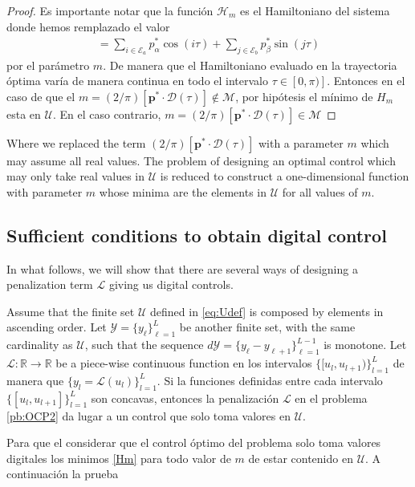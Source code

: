 \begin{proof}
Es importante notar que la función $\mathcal{H}_m$ es el Hamiltoniano del sistema donde hemos remplazado el valor 
\begin{gather}
	[\bm{p}^* \cdot \bm{\mathcal{D}}(\tau)] = \sum_{i \in \mathcal{E}_a} p^*_\alpha \cos(i\tau) + \sum_{j \in \mathcal{E}_b} p^*_\beta \sin(j\tau) 
\end{gather}
por el parámetro $m$. De manera que el Hamiltoniano evaluado en la trayectoria óptima varía de manera continua en todo el intervalo $\tau \in [0,\pi)]$. Entonces en el caso de que el $m = (2/\pi)[\bm{p}^* \cdot \bm{\mathcal{D}}(\tau)] \notin \mathcal{M}$, por hipótesis el mínimo de $H_m$ esta en $\mathcal{U}$. En el caso contrario, $m = (2/\pi)[\bm{p}^* \cdot \bm{\mathcal{D}}(\tau)] \in \mathcal{M}$  

\end{proof}
Where we replaced the term $(2/\pi)[\bm{p}^* \cdot \bm{\mathcal{D}}(\tau)]$ with a parameter $m$ which may assume all real values. The problem of designing an optimal control which may only take real values in $\mathcal{U}$ is reduced to construct a one-dimensional function with parameter $m$ whose minima are the elements in $\mathcal{U}$ for all values of $m$.

\subsection{Sufficient conditions to obtain digital control}

In what follows, we will show that there are several ways of designing a penalization term $\mathcal L$ giving us digital controls.
\newline
\begin{theorem}
Assume that the finite set $\mathcal{U}$ defined in \eqref{eq:Udef} is composed by elements in ascending order. Let $\mathcal{Y} = \{y_\ell\}_{\ell=1}^L$ be another finite set, with the same cardinality as $\mathcal U$, such that the sequence $d\mathcal{Y} = \{y_\ell - y_{\ell+1}\}_{\ell=1}^{L-1}$ is monotone. Let $\mathcal{L}:\mathbb{R} \rightarrow \mathbb{R}$ be a piece-wise continuous function en los intervalos $\{ [u_l,u_{l+1})\}_{l=1}^L$ de manera que $\{y_l = \mathcal{L}(u_l)\}_{l=1}^L$. Si la funciones definidas entre cada intervalo $\{[u_l,u_{l+1}]\}_{l=1}^L$ son concavas, entonces la penalización $\mathcal{L}$ en el problema \ref{pb:OCP2} da lugar a un control que solo toma valores en $\mathcal{U}$.
\end{theorem}
Para que el considerar que el control óptimo del problema solo toma valores digitales los minimos  \ref{Hm} para todo valor de $m$ de estar contenido en $\mathcal{U}$. A continuación la prueba
\newline

